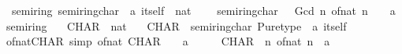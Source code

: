\begin{isabellebody}
\isamarkupfalse%
\ {\isacharparenleft}{\kern0pt}\ semiring{\isacharunderscore}{\kern0pt}{}{\isacharparenright}{\kern0pt}\ semiring{\isacharunderscore}{\kern0pt}char\ {\isacharcolon}{\kern0pt}{\isacharcolon}{\kern0pt}\ {\isachardoublequoteopen}{\isacharprime}{\kern0pt}a\ itself\ {\isasymRightarrow}\ nat{\isachardoublequoteclose}\ \isanewline
\ \ \ {\isachardoublequoteopen}semiring{\isacharunderscore}{\kern0pt}char\ {\isacharunderscore}{\kern0pt}\ {\isacharequal}{\kern0pt}\ Gcd\ {\isacharbraceleft}{\kern0pt}n{\isachardot}{\kern0pt}\ of{\isacharunderscore}{\kern0pt}nat\ n\ {\isacharequal}{\kern0pt}\ {\isacharparenleft}{\kern0pt}{}\ {\isacharcolon}{\kern0pt}{\isacharcolon}{\kern0pt}\ {\isacharprime}{\kern0pt}a{\isacharparenright}{\kern0pt}{\isacharbraceright}{\kern0pt}{\isachardoublequoteclose}\isanewline
\isanewline
{}\isamarkupfalse%
\ semiring{\isacharunderscore}{\kern0pt}{}\isanewline
{}\isanewline
\isanewline
{}\isamarkupfalse%
\isanewline
\ \ \ CHAR\ {\isacharcolon}{\kern0pt}{\isacharcolon}{\kern0pt}\ nat\isanewline
\ \ \ {\isachardoublequoteopen}CHAR\ {\isasymequiv}\ semiring{\isacharunderscore}{\kern0pt}char\ {\isacharparenleft}{\kern0pt}Pure{\isachardot}{\kern0pt}type\ {\isacharcolon}{\kern0pt}{\isacharcolon}{\kern0pt}\ {\isacharprime}{\kern0pt}a\ itself{\isacharparenright}{\kern0pt}{\isachardoublequoteclose}\isanewline
{}\isanewline
\isanewline
{}\isamarkupfalse%
\ of{\isacharunderscore}{\kern0pt}nat{\isacharunderscore}{\kern0pt}CHAR\ {\isacharbrackleft}{\kern0pt}simp{\isacharbrackright}{\kern0pt}{\isacharcolon}{\kern0pt}\ {\isachardoublequoteopen}of{\isacharunderscore}{\kern0pt}nat\ CHAR\ {\isacharequal}{\kern0pt}\ {\isacharparenleft}{\kern0pt}{}\ {\isacharcolon}{\kern0pt}{\isacharcolon}{\kern0pt}\ {\isacharprime}{\kern0pt}a{\isacharparenright}{\kern0pt}{\isachardoublequoteclose}\isanewline
%
\isadelimproof
%
\endisadelimproof
%
\isatagproof
{}\isamarkupfalse%
\ {\isacharminus}{\kern0pt}\isanewline
\ \ \isamarkupfalse%
\ {\isachardoublequoteopen}CHAR\ {\isasymin}\ {\isacharbraceleft}{\kern0pt}n{\isachardot}{\kern0pt}\ of{\isacharunderscore}{\kern0pt}nat\ n\ {\isacharequal}{\kern0pt}\ {\isacharparenleft}{\kern0pt}{}{\isacharcolon}{\kern0pt}{\isacharcolon}{\kern0pt}{\isacharprime}{\kern0pt}a{\isacharparenright}{\kern0pt}{\isacharbraceright}{\kern0pt}{\isachardoublequoteclose}\isanewline

\end{isabellebody}

